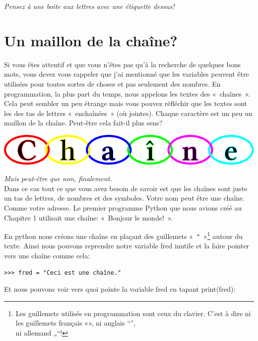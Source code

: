\emph{Pensez à une boite aux lettres avec une étiquette dessus!}



\section{Un maillon de la chaîne?}

Si vous êtes attentif et que vous n'êtes pas qu'à la recherche de quelques bons mots, vous devez vous rappeler que j'ai mentionné que les variables peuvent être utilisées  pour toutes sortes de choses et pas seulement des nombres.
En programmation, la plus part du temps, nous appelons les textes des «~chaînes~». Cela peut sembler un peu étrange mais vous pouvez réfléchir que les textes sont les des tas de lettres «~enchaînées~» (où jointes). Chaque caractère est un peu un maillon de la chaîne. Peut-être cela fait-il plus sens?\\
\begin{center}
\includegraphics[scale=1]{images/chaine.pdf} 
\end{center}

\emph{Mais peut-être que non, finalement.}\\


Dans ce cas tout ce que vous avez besoin de savoir est que les chaînes sont juste un tas de lettres, de nombres et 
 des symboles. Votre nom peut être une chaîne. Comme votre adresse. Le premier programme Python que nous avions créé au Chapitre 1 utilisait une chaîne: «~Bonjour le monde!~». 


En python nous créons une chaîne en plaçant des guillemets «~\texttt{"}~»\footnote{Les guillemets utilisés en programmation sont ceux du clavier. C'est à dire ni les guillemets français «», ni anglais “”,\\ ni allemand  „“!} autour du texte. Ainsi nous pouvons reprendre notre variable 
fred inutile et la faire pointer vers une chaîne comme cela:

\begin{Verbatim}[frame=single,rulecolor=\color{mbleu}, label=à taper]
>>> fred = "Ceci est une chaîne."
\end{Verbatim}

Et nous pouvons voir vers quoi pointe la variable fred en tapant print(fred):

